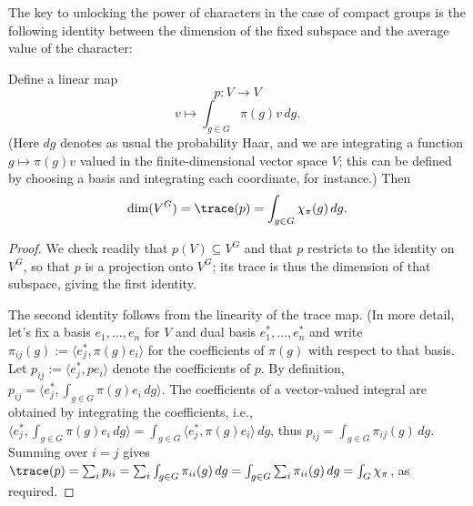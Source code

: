 \documentclass[reqno]{amsart} 
\begin{document}
The key to unlocking the power of characters in the case of compact groups is the following identity between the dimension of the fixed subspace and the average value of the character:
\begin{lemma}
  Define a linear map
  \begin{equation*}
    p : V \rightarrow V
  \end{equation*}
  \begin{equation*}
    v \mapsto \int_{g \in G} \pi(g) v \, d g.
  \end{equation*}
  (Here $d g$ denotes as usual the probability Haar, and we are integrating a function $g \mapsto \pi(g) v$ valued in the finite-dimensional vector space $V$; this can be defined by choosing a basis and integrating each coordinate, for instance.)  Then
  \begin{equation*}
    \dim(V^G) = \trace(p)
    = \int_{g \in G} \chi_\pi(g) \, d g.
  \end{equation*}
\end{lemma}
\begin{proof}
  We check readily that $p(V) \subseteq V^G$ and that $p$ restricts to the identity on $V^G$, so that $p$ is a projection onto $V^G$; its trace is thus the dimension of that subspace, giving the first identity.

  The second identity follows from the linearity of the trace map.  (In more detail, let's fix a basis $e_1,\dotsc,e_n$ for $V$ and dual basis $e_1^*,\dotsc,e_n^*$ and write $\pi_{ij}(g) := \langle e_j^*, \pi(g) e_i \rangle$ for the coefficients of $\pi(g)$ with respect to that basis.  Let $p_{ij} := \langle e_j^*, p e_i \rangle$ denote the coefficients of $p$.  By definition, $p_{i j} = \langle e_j^*, \int_{g \in G} \pi(g) e_i \, d g \rangle$.  The coefficients of a vector-valued integral are obtained by integrating the coefficients, i.e., $\langle e_j^*, \int_{g \in G} \pi(g) e_i \, d g \rangle = \int_{g \in G} \langle e_j^*, \pi(g) e_i \rangle \, d g$, thus $p_{i j} = \int_{g \in G} \pi_{i j}(g) \, d g$.  Summing over $i = j$ gives $\trace(p) = \sum_i p_{i i} = \sum_{i} \int_{g \in G} \pi_{i i}(g) \, d g =\int_{g \in G} \sum_{i} \pi_{i i}(g) \, d g = \int_{G} \chi_\pi$, as required.
\end{proof}
\end{document}
